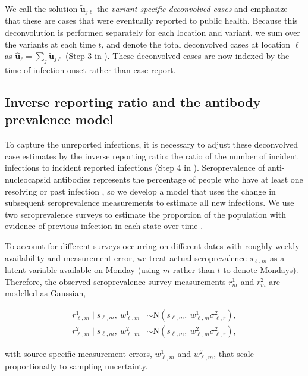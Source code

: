 We call the solution $\widetilde{\mathbf{u}}_{j\ell}$ the \emph{variant-specific
deconvolved cases} and emphasize that these are cases that were eventually
reported to public health. Because this deconvolution is performed separately
for each location and variant, we sum over the variants at each time $t$, and
denote the total deconvolved cases at location $\ell$ as
$\widehat{\mathbf{u}}_\ell = \sum_j \widetilde{\mathbf{u}}_{j\ell}$ (Step 3 in
). These deconvolved cases are now
indexed by the time of infection onset rather than case report.




\subsection{Inverse reporting ratio and the antibody prevalence model} 
\label{sec:report-ratio}

To capture the unreported infections, it is necessary to adjust these
deconvolved case estimates by the inverse reporting ratio: the ratio of the
number of incident infections to incident reported infections (Step 4 in
). Seroprevalence of anti-nucleocapsid
antibodies represents the percentage of people who have at least one resolving
or past infection \citep{cdc2020data}, so we develop a model that uses the
change in subsequent seroprevalence measurements to estimate all new infections.
We use two seroprevalence surveys to estimate the proportion of the population
with evidence of previous infection in each state over time
\citep[see also Appendix~G]{cdc2021blood, cdc2021comm}.

To account for different surveys occurring on different dates with roughly
weekly availability and measurement error, we treat actual seroprevalence
$s_{\ell,m}$ as a latent variable available on Monday (using $m$ rather than $t$
to denote Mondays). Therefore, the observed seroprevalence survey measurements
$r^1_m$ and $r^2_m$ are modelled as Gaussian,
\begin{linenomath*}
\begin{align}
\label{eq:sero-measurements}
r^1_{\ell,m} \mid s_{\ell,m},\ w^1_{\ell,m} &\sim \textrm{N}(s_{\ell,m},\ w^1_{\ell,m}
\sigma^2_{\ell,r}),\\
r^2_{\ell,m} \mid s_{\ell,m},\  w^2_{\ell,m}
  &\sim \textrm{N}(s_{\ell,m},\ w^2_{\ell,m}\sigma^2_{\ell,r}),
\end{align}
\end{linenomath*}
with source-specific measurement errors, $w^1_{\ell,m}$ and $w^2_{\ell,m}$, that
scale proportionally to sampling uncertainty.

